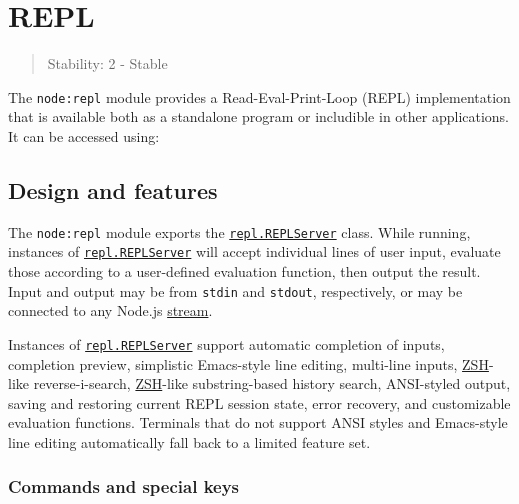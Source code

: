\section{REPL}\label{repl}

\begin{quote}
Stability: 2 - Stable
\end{quote}

The \texttt{node:repl} module provides a Read-Eval-Print-Loop (REPL)
implementation that is available both as a standalone program or
includible in other applications. It can be accessed using:

\begin{Shaded}
\begin{Highlighting}[]
\OperatorTok{=} \NormalTok{(}\NormalTok{)}\OperatorTok{;}
\end{Highlighting}
\end{Shaded}

\subsection{Design and features}\label{design-and-features}

The \texttt{node:repl} module exports the
\hyperref[class-replserver]{\texttt{repl.REPLServer}} class. While
running, instances of
\hyperref[class-replserver]{\texttt{repl.REPLServer}} will accept
individual lines of user input, evaluate those according to a
user-defined evaluation function, then output the result. Input and
output may be from \texttt{stdin} and \texttt{stdout}, respectively, or
may be connected to any Node.js \href{stream.md}{stream}.

Instances of \hyperref[class-replserver]{\texttt{repl.REPLServer}}
support automatic completion of inputs, completion preview, simplistic
Emacs-style line editing, multi-line inputs,
\href{https://en.wikipedia.org/wiki/Z_shell}{ZSH}-like reverse-i-search,
\href{https://en.wikipedia.org/wiki/Z_shell}{ZSH}-like substring-based
history search, ANSI-styled output, saving and restoring current REPL
session state, error recovery, and customizable evaluation functions.
Terminals that do not support ANSI styles and Emacs-style line editing
automatically fall back to a limited feature set.

\subsubsection{Commands and special
keys}\label{commands-and-special-keys}

